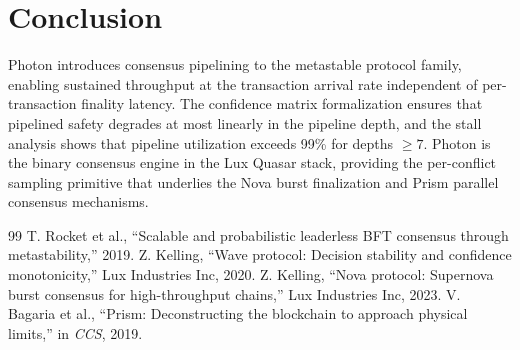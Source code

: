 \section{Conclusion}

\label{sec:conclusion}

Photon introduces consensus pipelining to the metastable protocol family, enabling
sustained throughput at the transaction arrival rate independent of per-transaction
finality latency. The confidence matrix formalization ensures that pipelined safety
degrades at most linearly in the pipeline depth, and the stall analysis shows that
pipeline utilization exceeds 99\% for depths $\geq 7$. Photon is the binary consensus
engine in the Lux Quasar stack, providing the per-conflict sampling primitive that
underlies the Nova burst finalization and Prism parallel consensus mechanisms.

\begin{thebibliography}{99}
 T. Rocket et al., ``Scalable and probabilistic leaderless BFT consensus through metastability,'' 2019.
 Z. Kelling, ``Wave protocol: Decision stability and confidence monotonicity,'' Lux Industries Inc, 2020.
 Z. Kelling, ``Nova protocol: Supernova burst consensus for high-throughput chains,'' Lux Industries Inc, 2023.
 V. Bagaria et al., ``Prism: Deconstructing the blockchain to approach physical limits,'' in \emph{CCS}, 2019.
\end{thebibliography}

